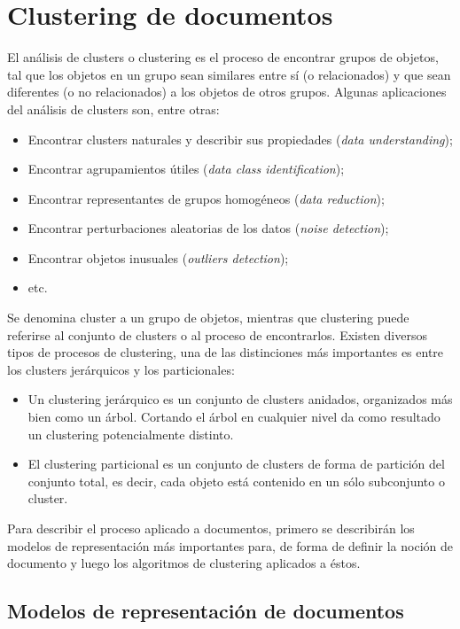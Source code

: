 \section{Clustering de documentos}
\label{sec-2.2}


   El análisis de clusters o clustering es el proceso de encontrar
   grupos de objetos, tal que los objetos en un grupo sean similares
   entre sí (o relacionados) y que sean diferentes (o no relacionados)
   a los objetos de otros grupos. Algunas aplicaciones del análisis de
   clusters son, entre otras:
\begin{itemize}
\item Encontrar clusters naturales y describir sus propiedades (\emph{data understanding});
\item Encontrar agrupamientos útiles (\emph{data class identification});
\item Encontrar representantes de grupos homogéneos (\emph{data reduction});
\item Encontrar perturbaciones aleatorias de los datos (\emph{noise detection});
\item Encontrar objetos inusuales (\emph{outliers detection});
\item etc.
\end{itemize}
   Se denomina cluster a un grupo de objetos, mientras que
   clustering puede referirse al conjunto de clusters o al proceso de
   encontrarlos. Existen diversos tipos de procesos de clustering, una
   de las distinciones más importantes es entre los clusters
   jerárquicos y los particionales:
\begin{itemize}
\item Un clustering jerárquico es un conjunto de clusters anidados,
     organizados más bien como un árbol. Cortando el árbol en
     cualquier nivel da como resultado un clustering potencialmente
     distinto.
\item El clustering particional es un conjunto de clusters de forma de
     partición del conjunto total, es decir, cada objeto está
     contenido en un sólo subconjunto o cluster.
\end{itemize}
   Para describir el proceso aplicado a documentos, primero se
   describirán los modelos de representación más importantes para,
   de forma de definir la noción de documento y luego los
   algoritmos de clustering aplicados a éstos.

\subsection{Modelos de representación de documentos}
\label{sec-2.2.1}


